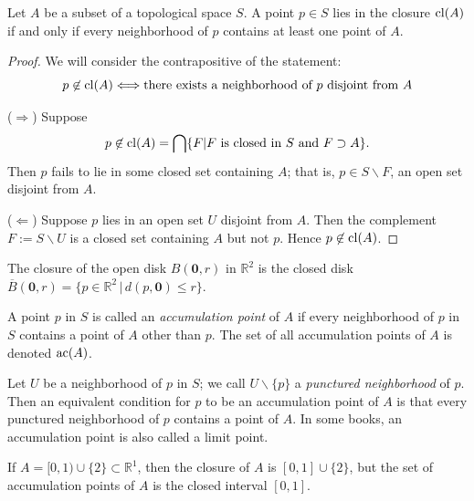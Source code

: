 \begin{proposition}\label{prop:closure_local}
	Let $A$ be a subset of a topological space $S$. A point $p\in S$ lies in
	the closure $\operatorname{cl}(A)$ if and only if every neighborhood of $p$ contains
	at least one point of $A$.
\end{proposition}

\begin{proof} We will consider the contrapositive of the statement:
	\begin{displaymath}
		p\not\in \operatorname{cl}(A) \Longleftrightarrow \text{there exists a neighborhood
			of $p$ disjoint from $A$}
	\end{displaymath}

	($\Longrightarrow$) Suppose
	\begin{displaymath}
		p\not\in \operatorname{cl}(A) = \bigcap \{F | \text{$F$ is closed in $S$ and
			$F\supset A$}\}.
	\end{displaymath}
	Then $p$ fails to lie in some closed set containing $A$; that is, $p\in
		S\smallsetminus F$, an open set disjoint from $A$.

	($\Longleftarrow$) Suppose $p$ lies in an open set $U$ disjoint from
	$A$. Then the complement $F:=S\smallsetminus U$ is a closed set
	containing $A$ but not $p$. Hence $p\not\in \operatorname{cl}(A)$.

\end{proof}

\begin{example} The closure of the open disk $B(\mathbf{0},r)$ in
	$\mathbb{R}^2$ is the closed disk $\overline{B}(\mathbf{0},r) =
		\{p\in\mathbb{R}^2 \,|\, d(p,\mathbf{0})\le r \}$.

\end{example}

\begin{definition}
	A point $p$ in $S$ is called an \emph{accumulation point} of $A$ if
	every neighborhood of $p$ in $S$ contains a point of $A$ other than $p$.
	The set of all accumulation points of $A$ is denoted $\operatorname{ac}(A)$.
\end{definition}


Let $U$ be a neighborhood of $p$ in $S$; we call $U\smallsetminus\{p\}$ a
\emph{punctured neighborhood} of $p$. Then an equivalent condition for $p$ to
be an accumulation point of $A$ is that every punctured neighborhood of $p$
contains a point of $A$. In some books, an accumulation point is also called a
limit point.

\begin{example}
	If $A=[0,1)\cup\{2\}\subset\mathbb{R}^1$, then the closure of $A$ is
	$[0,1]\cup\{2\}$, but the set of accumulation points of $A$ is the
	closed interval $[0,1]$.
\end{example}

